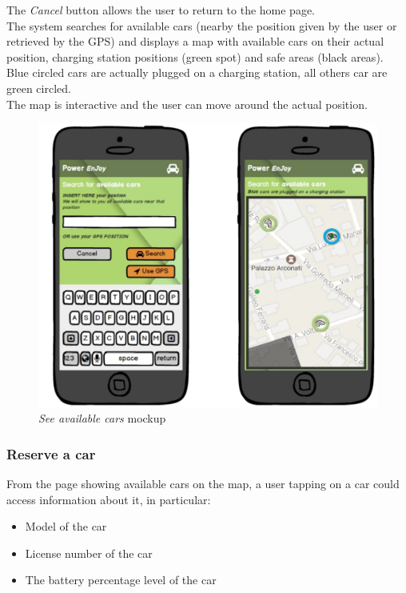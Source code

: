 The \emph{Cancel} button allows the user to return to the home page. \\

The system searches for available cars (nearby the position given by the user or retrieved by the GPS) and displays a map with available cars on their actual position, charging station positions (green spot) and safe areas (black areas). Blue circled cars are actually plugged on a charging station, all others car are green circled.\\

The map is interactive and the user can move around the actual position. \\

	\begin{figure}[h]
			\centering
			\includegraphics[width=0.9\linewidth]{mockups/findCar}
			\caption{
				\label{fig:searchCar} 
				\emph{See available cars} mockup
			}
		\end{figure}

\subsubsection{Reserve a car}

From the page showing available cars on the map, a user tapping on a car could access information about it, in particular:
\begin{itemize}
	\item Model of the car
	\item License number of the car
	\item The battery percentage level of the car
\end{itemize}

